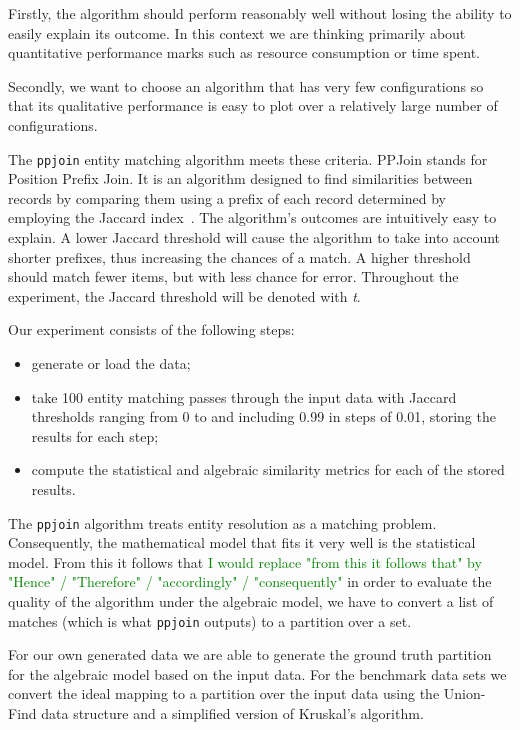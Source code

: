 Firstly, the algorithm should perform reasonably well without losing the ability
to easily explain its outcome.
In this context we are thinking primarily about quantitative performance marks
such as resource consumption or time spent.

Secondly, we want to choose an algorithm that has very few configurations so
that its qualitative performance is easy to plot over a relatively large  number
of configurations.

The \texttt{ppjoin}\cite{ppjoin} entity matching algorithm meets these criteria.
PPJoin stands for Position Prefix Join.
It is an algorithm designed to find similarities between records by comparing
them using a prefix of each record determined by employing the Jaccard
index~\cite{jaccard1912,finley1996}.
The algorithm's outcomes are intuitively easy to explain.
A lower Jaccard threshold will cause the algorithm to take into account shorter
prefixes, thus increasing the chances of a match.
A higher threshold should match fewer items, but with less chance for error.
Throughout the experiment, the Jaccard threshold will be denoted with \textit{t}.

Our experiment consists of the following steps:

\begin{itemize}
    \item generate or load the data;
    \item take 100 entity matching passes through the input data with
          Jaccard thresholds ranging from 0 to and including 0.99 in steps of
          0.01, storing the results for each step;
    \item compute the statistical and algebraic similarity metrics for each
          of the stored results.
\end{itemize}

The \texttt{ppjoin} algorithm treats entity resolution as a matching problem.
Consequently, the mathematical model that fits it very well is the statistical
model.
From this it follows that 
\textcolor{green}{I would replace "from this it follows that" by "Hence" / "Therefore" / "accordingly" / "consequently"} 
in order to evaluate the quality of the algorithm
under the algebraic model, we have to convert a list of matches (which is what
\texttt{ppjoin} outputs) to a partition over a set.

For our own generated data we are able to generate the ground truth partition
for the algebraic model based on the input data.
For the benchmark data sets we convert the ideal mapping to a partition over the
input data using the Union-Find data structure and a simplified version of
Kruskal's algorithm.

